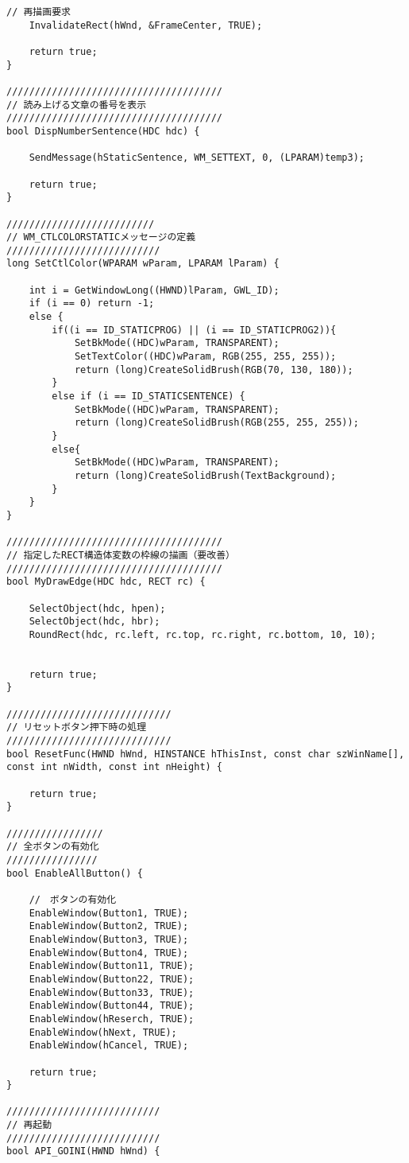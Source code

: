 \begin{lstlisting}[caption=main.cpp]
	// 再描画要求
	InvalidateRect(hWnd, &FrameCenter, TRUE);

	return true;
}

//////////////////////////////////////
// 読み上げる文章の番号を表示
//////////////////////////////////////
bool DispNumberSentence(HDC hdc) {

	SendMessage(hStaticSentence, WM_SETTEXT, 0, (LPARAM)temp3);

	return true;
}

//////////////////////////
// WM_CTLCOLORSTATICメッセージの定義
///////////////////////////
long SetCtlColor(WPARAM wParam, LPARAM lParam) {

	int i = GetWindowLong((HWND)lParam, GWL_ID);
	if (i == 0) return -1;
	else {
		if((i == ID_STATICPROG) || (i == ID_STATICPROG2)){
			SetBkMode((HDC)wParam, TRANSPARENT);
			SetTextColor((HDC)wParam, RGB(255, 255, 255));
			return (long)CreateSolidBrush(RGB(70, 130, 180));
		}
		else if (i == ID_STATICSENTENCE) {
			SetBkMode((HDC)wParam, TRANSPARENT);
			return (long)CreateSolidBrush(RGB(255, 255, 255));
		}
		else{
			SetBkMode((HDC)wParam, TRANSPARENT);
			return (long)CreateSolidBrush(TextBackground);
		}	
	}
}

//////////////////////////////////////
// 指定したRECT構造体変数の枠線の描画（要改善）
//////////////////////////////////////
bool MyDrawEdge(HDC hdc, RECT rc) {
	
	SelectObject(hdc, hpen);
	SelectObject(hdc, hbr);
	RoundRect(hdc, rc.left, rc.top, rc.right, rc.bottom, 10, 10);
	

	return true;
}

/////////////////////////////
// リセットボタン押下時の処理
/////////////////////////////
bool ResetFunc(HWND hWnd, HINSTANCE hThisInst, const char szWinName[], const int nWidth, const int nHeight) {

	return true;
}

/////////////////
// 全ボタンの有効化
////////////////
bool EnableAllButton() {

	//　ボタンの有効化
	EnableWindow(Button1, TRUE);
	EnableWindow(Button2, TRUE);
	EnableWindow(Button3, TRUE);
	EnableWindow(Button4, TRUE);
	EnableWindow(Button11, TRUE);
	EnableWindow(Button22, TRUE);
	EnableWindow(Button33, TRUE);
	EnableWindow(Button44, TRUE);
	EnableWindow(hReserch, TRUE);
	EnableWindow(hNext, TRUE);
	EnableWindow(hCancel, TRUE);

	return true;
}

///////////////////////////
// 再起動
///////////////////////////
bool API_GOINI(HWND hWnd) {


\end{lstlisting}
